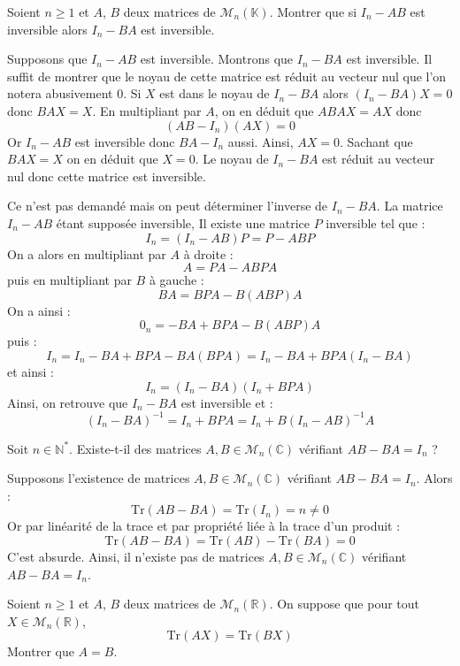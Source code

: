 \documentclass[a4paper,10pt]{report}
\begin{document}
\begin{Exercice}{} Soient $n\geq 1$ et $A$, $B$ deux matrices de $\mathcal{M}_n(\mathbb{K})$. Montrer que si $I_n - AB$ est inversible alors $I_n - BA$ est inversible.
\end{Exercice} 

\corr Supposons que $I_n -AB$ est inversible. Montrons que $I_n-BA$ est inversible. Il suffit de montrer que le noyau de cette matrice est réduit au vecteur nul que l'on notera abusivement $0$. Si $X$ est dans le noyau de $I_n-BA$ alors $(I_n- BA)X=0$ donc $BAX=X$. En multipliant par $A$, on en déduit que $ABAX=AX$ donc 
$$ (AB-I_n)(AX)=0$$
Or $I_n -AB$ est inversible donc $BA-I_n$ aussi. Ainsi, $AX=0$. Sachant que $BAX=X$ on en déduit que $X=0$. Le noyau de $I_n-BA$ est réduit au vecteur nul donc cette matrice est inversible.

\medskip

\noindent Ce n'est pas demandé mais on peut déterminer l'inverse de $I_n-BA$. La matrice $I_n-AB$ étant supposée inversible, Il existe une matrice $P$ inversible tel que :
$$ I_n= (I_n-AB)P = P- ABP$$
On a alors en multipliant par $A$ à droite : 
$$ A = PA-ABPA$$
puis en multipliant par $B$ à gauche :
$$ BA = BPA- B(ABP)A$$
On a ainsi :
$$ 0_n = -BA + BPA- B(ABP)A$$
puis :
$$ I_n = I_n - BA +BPA - BA(BPA) = I_n - BA + BPA(I_n- BA)$$
et ainsi :
$$ I_n = (I_n-BA)(I_n+BPA)$$
Ainsi, on retrouve que $I_n-BA$ est inversible et :
$$ (I_n-BA)^{-1} = I_n+BPA = I_n+B(I_n-AB)^{-1}A$$


\begin{Exercice}{} Soit $n \in \mathbb{N}^*$. Existe-t-il des matrices $A,B \in \mathcal{M}_n(\mathbb{C})$ vérifiant $AB - BA = I_n$ ?
\end{Exercice}

\corr Supposons l'existence de matrices $A,B \in \mathcal{M}_n(\mathbb{C})$ vérifiant $AB - BA = I_n$. Alors :
$$ \textrm{Tr}(AB-BA) = \textrm{Tr}(I_n) = n \neq 0$$
Or par linéarité de la trace et par propriété liée à la trace d'un produit :
$$  \textrm{Tr}(AB-BA) =  \textrm{Tr}(AB)- \textrm{Tr}(BA) = 0$$
C'est absurde. Ainsi, il n'existe pas de matrices $A,B \in \mathcal{M}_n(\mathbb{C})$ vérifiant $AB - BA = I_n$.

\begin{Exercice}{} Soient $n \geq 1$ et $A$, $B$ deux matrices de $\mathcal{M}_n(\mathbb{R})$. On suppose que pour tout $X \in \mathcal{M}_n(\mathbb{R})$, 
$$\textrm{Tr}(AX)= \textrm{Tr}(BX)$$
Montrer que $A=B$.
\end{Exercice}
\end{document}
